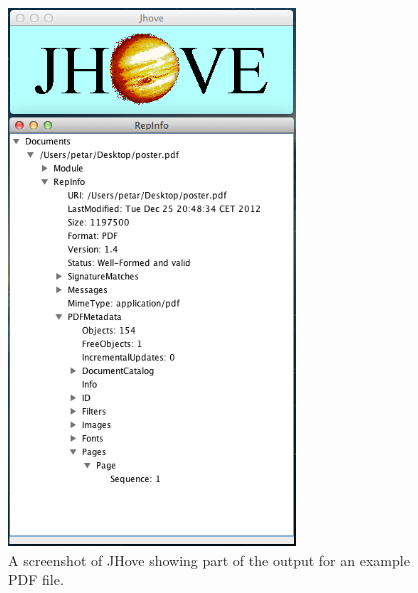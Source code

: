 \begin{figure}[th]
\begin{center}
\includegraphics[width=3in]{figures/related/jhove_example.png}
\caption{A screenshot of JHove showing part of the output for an example PDF file.}
\label{fig:jhove_screenshot}
\end{center}
\end{figure}

\clearpage


